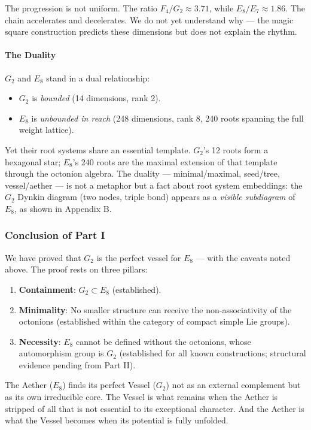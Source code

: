 \documentclass[12pt,a4paper]{article}
\begin{document}
The progression is not uniform. The ratio $F_4/G_2 \approx 3.71$, while $E_8/E_7 \approx 1.86$. The chain accelerates and decelerates. We do not yet understand why --- the magic square construction predicts these dimensions but does not explain the rhythm.

\paragraph{The Duality}

$G_2$ and $E_8$ stand in a dual relationship:

\begin{itemize}
    \item $G_2$ is \emph{bounded} (14 dimensions, rank 2).
    \item $E_8$ is \emph{unbounded in reach} (248 dimensions, rank 8, 240 roots spanning the full weight lattice).
\end{itemize}

Yet their root systems share an essential template. $G_2$'s 12 roots form a hexagonal star; $E_8$'s 240 roots are the maximal extension of that template through the octonion algebra. The duality --- minimal/maximal, seed/tree, vessel/aether --- is not a metaphor but a fact about root system embeddings: the $G_2$ Dynkin diagram (two nodes, triple bond) appears as a \emph{visible subdiagram} of $E_8$, as shown in Appendix B.

\subsubsection{Conclusion of Part I}

We have proved that $G_2$ is the perfect vessel for $E_8$ --- with the caveats noted above. The proof rests on three pillars:

\begin{enumerate}
    \item \textbf{Containment}: $G_2 \subset E_8$ (established).
    \item \textbf{Minimality}: No smaller structure can receive the non-associativity of the octonions (established within the category of compact simple Lie groups).
    \item \textbf{Necessity}: $E_8$ cannot be defined without the octonions, whose automorphism group is $G_2$ (established for all known constructions; structural evidence pending from Part II).
\end{enumerate}

The Aether ($E_8$) finds its perfect Vessel ($G_2$) not as an external complement but as its own irreducible core. The Vessel is what remains when the Aether is stripped of all that is not essential to its exceptional character. And the Aether is what the Vessel becomes when its potential is fully unfolded.
\end{document}
